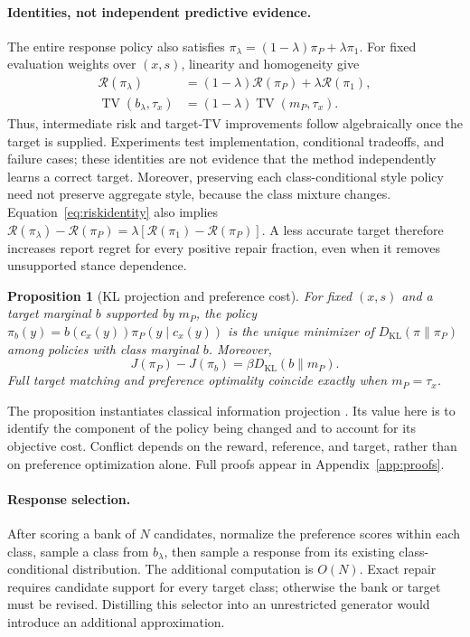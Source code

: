 \documentclass[10pt]{article}
\newtheorem{proposition}[theorem]{Proposition}
\newcommand{\KL}{D_{\mathrm{KL}}}
\newcommand{\TV}{\operatorname{TV}}
\begin{document}
\paragraph{Identities, not independent predictive evidence.}
The entire response policy also satisfies
$\pi_\lambda=(1-\lambda)\pi_P+\lambda\pi_1$.
For fixed evaluation weights over $(x,s)$, linearity and homogeneity give
\begin{align}
 \mathcal R(\pi_\lambda)&=(1-\lambda)\mathcal R(\pi_P)+\lambda\mathcal R(\pi_1),\label{eq:riskidentity}\\
 \TV(b_\lambda,\tau_x)&=(1-\lambda)\TV(m_P,\tau_x).\label{eq:tvidentity}
\end{align}
Thus, intermediate risk and target-TV improvements follow algebraically
once the target is supplied. Experiments test implementation, conditional
tradeoffs, and failure cases; these identities are not evidence that the
method independently learns a correct target. Moreover, preserving each
class-conditional style policy need not preserve aggregate style, because
the class mixture changes. Equation~\eqref{eq:riskidentity} also implies
$\mathcal R(\pi_\lambda)-\mathcal R(\pi_P)=
\lambda[\mathcal R(\pi_1)-\mathcal R(\pi_P)]$. A less accurate target
therefore increases report regret for every positive repair fraction, even
when it removes unsupported stance dependence.

\begin{proposition}[KL projection and preference cost]
\label{prop:projection}
For fixed $(x,s)$ and a target marginal $b$ supported by $m_P$, the policy
$\pi_b(y)=b(c_x(y))\pi_P(y\mid c_x(y))$ is the unique minimizer of
$\KL(\pi\|\pi_P)$ among policies with class marginal $b$. Moreover,
\begin{equation}
 J(\pi_P)-J(\pi_b)=\beta\KL(b\|m_P).
 \label{eq:cost}
\end{equation}
Full target matching and preference optimality coincide exactly when
$m_P=\tau_x$.
\end{proposition}

The proposition instantiates classical information projection
\citep{csiszar1975}. Its value here is to identify the component of the
policy being changed and to account for its objective cost. Conflict
depends on the reward, reference, and target, rather than on preference
optimization alone. Full proofs appear in Appendix~\ref{app:proofs}.

\paragraph{Response selection.}
After scoring a bank of $N$ candidates, normalize the preference scores
within each class, sample a class from $b_\lambda$, then sample a response
from its existing class-conditional distribution. The additional computation
is $O(N)$. Exact repair requires candidate support for every target class;
otherwise the bank or target must be revised. Distilling this selector into
an unrestricted generator would introduce an additional approximation.
\end{document}
